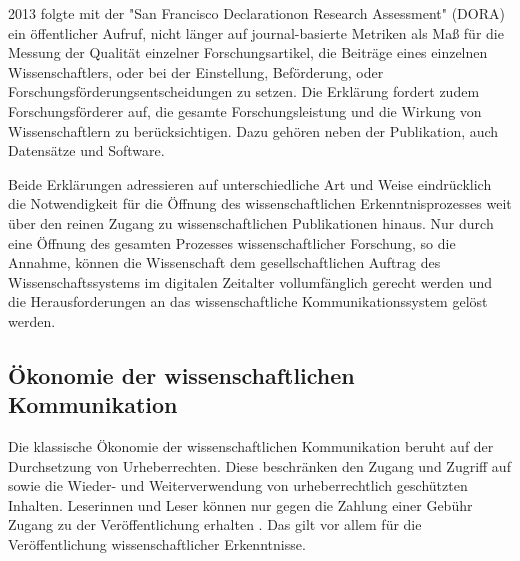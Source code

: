 2013 folgte mit der "San Francisco Declarationon Research Assessment" (DORA) \cite{DORA_2013} ein öffentlicher Aufruf, nicht länger auf journal-basierte Metriken als Maß für die Messung der Qualität einzelner Forschungsartikel, die Beiträge eines einzelnen Wissenschaftlers, oder bei der Einstellung, Beförderung, oder Forschungsförderungsentscheidungen zu setzen. Die Erklärung fordert zudem Forschungsförderer auf, die gesamte Forschungsleistung und die Wirkung von Wissenschaftlern zu berücksichtigen. Dazu gehören neben der Publikation, auch Datensätze und Software.

Beide Erklärungen adressieren auf unterschiedliche Art und Weise eindrücklich die Notwendigkeit für die Öffnung des wissenschaftlichen Erkenntnisprozesses weit über den reinen Zugang zu wissenschaftlichen Publikationen hinaus. Nur durch eine Öffnung des gesamten Prozesses wissenschaftlicher Forschung, so die Annahme, können die Wissenschaft dem gesellschaftlichen Auftrag des Wissenschaftssystems im digitalen Zeitalter vollumfänglich gerecht werden und die Herausforderungen an das wissenschaftliche Kommunikationssystem gelöst werden.

\subsection{Ökonomie der wissenschaftlichen Kommunikation}

Die klassische Ökonomie der wissenschaftlichen Kommunikation beruht auf der Durchsetzung von Urheberrechten. Diese beschränken den Zugang und Zugriff auf sowie die Wieder- und Weiterverwendung von urheberrechtlich geschützten Inhalten. Leserinnen und Leser können nur gegen die Zahlung einer Gebühr Zugang zu der Veröffentlichung erhalten \cite{CREATe_2014}. Das gilt vor allem für die Veröffentlichung wissenschaftlicher Erkenntnisse.

